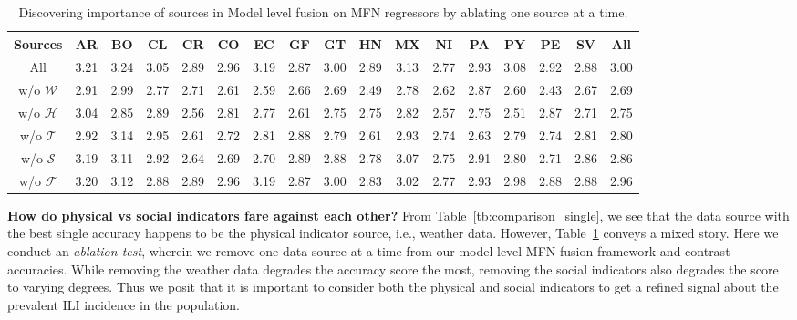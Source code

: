 \begin{table}[tb!]
  \centering
  \caption{\label{tb:Ablation} Discovering importance of sources in Model level fusion on MFN 
  regressors by ablating one source at a time.}
\vspace{1em}
\begin{tabular}{|*{17}{c|}}
\hline
Sources & AR & BO & CL & CR & CO & EC & GF & GT & HN & MX & NI & PA & PY & PE & SV & All\\
\hline 
\hline
All               & 3.21& 3.24& 3.05& 2.89& 2.96& 3.19& 2.87& 3.00& 2.89& 3.13& 2.77& 2.93& 3.08& 2.92& 2.88& 3.00\\
w/o $\mathcal{W}$ & 2.91& 2.99& 2.77& 2.71& 2.61& 2.59& 2.66& 2.69& 2.49& 2.78& 2.62& 2.87& 2.60& 2.43& 2.67& 2.69  \\
w/o $\mathcal{H}$ & 3.04& 2.85& 2.89& 2.56& 2.81& 2.77& 2.61& 2.75& 2.75& 2.82& 2.57& 2.75& 2.51& 2.87& 2.71& 2.75  \\
w/o $\mathcal{T}$ & 2.92& 3.14& 2.95& 2.61& 2.72& 2.81& 2.88& 2.79& 2.61& 2.93& 2.74& 2.63& 2.79& 2.74& 2.81& 2.80  \\
w/o $\mathcal{S}$ & 3.19& 3.11& 2.92& 2.64& 2.69& 2.70& 2.89& 2.88& 2.78& 3.07& 2.75& 2.91& 2.80& 2.71& 2.86& 2.86  \\
w/o $\mathcal{F}$ & 3.20& 3.12& 2.88& 2.89& 2.96& 3.19& 2.87& 3.00& 2.83& 3.02& 2.77& 2.93& 2.98& 2.88& 2.88& 2.96  \\
\hline
\end{tabular}
\end{table}

{\noindent \textbf{How do physical vs social indicators fare against each other?}} 
From Table~\ref{tb:comparison_single}, we 
see that the data source with the best single accuracy happens to be the physical indicator source, i.e.,
weather data. However, Table~\ref{tb:Ablation} conveys a mixed story. Here we conduct an {\it ablation test},
wherein we remove one data source at a time from our model level MFN fusion framework and contrast accuracies.
While removing the weather data degrades the accuracy score the most, removing the social indicators also degrades
the score to varying degrees.
Thus we posit that it is important to consider both the physical 
and social indicators to get a refined signal about the prevalent ILI incidence in the population.



